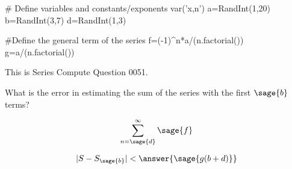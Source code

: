 \documentclass{ximera}
\renewcommand{\latexProblemContent}[1]{#1}
\begin{document}
\begin{sagesilent}
# Define variables and constants/exponents
var('x,n')
a=RandInt(1,20)
b=RandInt(3,7)
d=RandInt(1,3)

#Define the general term of the series
f=(-1)^n*a/(n.factorial())
g=a/(n.factorial())

\end{sagesilent}

\latexProblemContent{
\ifVerboseLocation This is Series Compute Question 0051. \\ \fi
\begin{problem}
What is the error in estimating the sum of the series with the first $\sage{b}$ terms?

\[\sum_{n=\sage{d}}^\infty \sage{f}\]



\[|S-S_{\sage{b}}|< \answer{\sage{g(b+d)}}\]

\end{problem}}%
\end{document}
